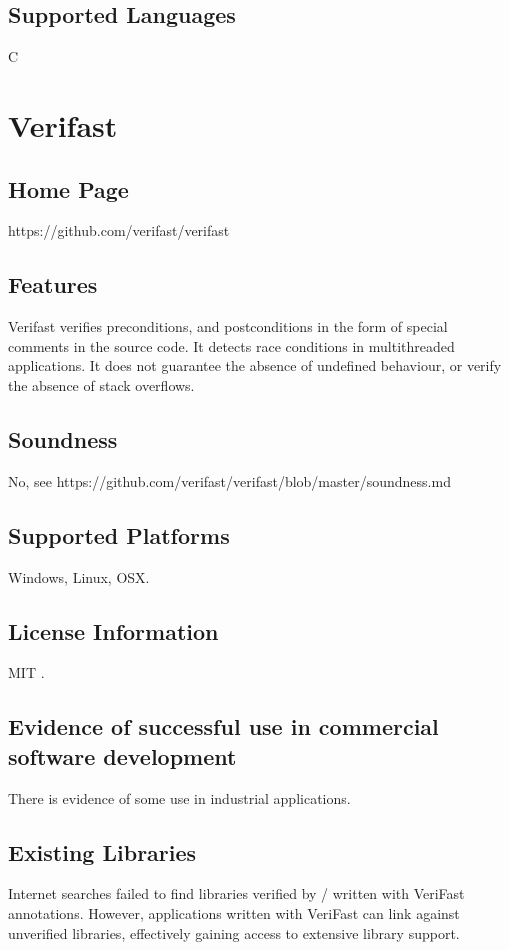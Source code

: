 \documentclass[12pt,openany,a4paper]{book}
\begin{document}
	\subsection{Supported Languages}
	C




\section{Verifast}
	\subsection{Home Page}%
	https://github.com/verifast/verifast

	\subsection{Features}
	Verifast verifies preconditions, and postconditions in the form of special comments in the source code.
	It detects race conditions in multithreaded applications. It does not guarantee the absence of undefined behaviour, or verify the absence of stack overflows.	
	
	\subsection{Soundness}
	No, see https://github.com/verifast/verifast/blob/master/soundness.md
	\subsection{Supported Platforms}
	Windows, Linux, OSX.

	\subsection{License Information} 
	MIT \cite {verifastlicense}.
	\subsection{Evidence of successful use in commercial software development}
	There is evidence of some use in industrial applications\cite{PhilippaertsPieter2014SvwV}.
	\subsection{Existing Libraries}
		Internet searches failed to find libraries verified by / written with VeriFast annotations. However, applications written with VeriFast can link against unverified libraries, effectively gaining access to extensive library support.
\end{document}
